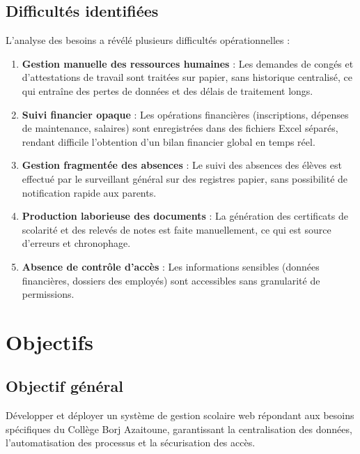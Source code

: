 \documentclass[12pt,a4paper]{report}
\begin{document}
\section{Difficultés identifiées}

L'analyse des besoins a révélé plusieurs difficultés opérationnelles :

\begin{enumerate}
    \item \textbf{Gestion manuelle des ressources humaines} : Les demandes de congés et d'attestations de travail sont traitées sur papier, sans historique centralisé, ce qui entraîne des pertes de données et des délais de traitement longs.

    \item \textbf{Suivi financier opaque} : Les opérations financières (inscriptions, dépenses de maintenance, salaires) sont enregistrées dans des fichiers Excel séparés, rendant difficile l'obtention d'un bilan financier global en temps réel.

    \item \textbf{Gestion fragmentée des absences} : Le suivi des absences des élèves est effectué par le surveillant général sur des registres papier, sans possibilité de notification rapide aux parents.

    \item \textbf{Production laborieuse des documents} : La génération des certificats de scolarité et des relevés de notes est faite manuellement, ce qui est source d'erreurs et chronophage.

    \item \textbf{Absence de contrôle d'accès} : Les informations sensibles (données financières, dossiers des employés) sont accessibles sans granularité de permissions.
\end{enumerate}

\chapter{Objectifs}

\section{Objectif général}

Développer et déployer un système de gestion scolaire web répondant aux besoins spécifiques du Collège Borj Azaitoune, garantissant la centralisation des données, l'automatisation des processus et la sécurisation des accès.
\end{document}
